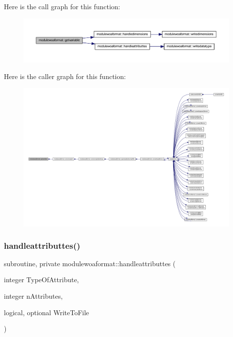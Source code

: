 Here is the call graph for this function\+:\nopagebreak
\begin{figure}[H]
\begin{center}
\leavevmode
\includegraphics[width=350pt]{namespacemodulewoaformat_a0dce7fe9b034991dc5845a3e8ecc8cba_cgraph}
\end{center}
\end{figure}
Here is the caller graph for this function\+:\nopagebreak
\begin{figure}[H]
\begin{center}
\leavevmode
\includegraphics[width=350pt]{namespacemodulewoaformat_a0dce7fe9b034991dc5845a3e8ecc8cba_icgraph}
\end{center}
\end{figure}
\mbox{\label{namespacemodulewoaformat_a54028cfada0d5c06f32d22ec3050fc95}} 
\subsubsection{\texorpdfstring{handleattributtes()}{handleattributtes()}}
{\footnotesize\ttfamily subroutine, private modulewoaformat\+::handleattributtes (\begin{DoxyParamCaption}\item[{integer}]{Type\+Of\+Attribute,  }\item[{integer}]{n\+Attributes,  }\item[{logical, optional}]{Write\+To\+File }\end{DoxyParamCaption})\hspace{0.3cm}{\ttfamily [private]}}

